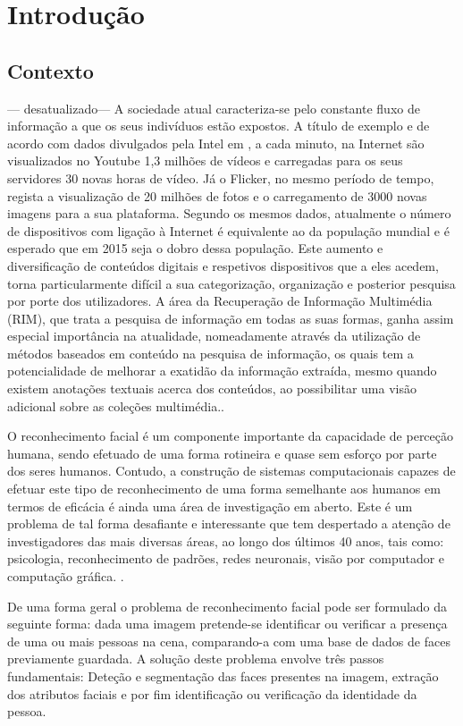 \chapter{Introdução} \label{chap:intro}

\section{Contexto} \label{sec:context}
--- desatualizado---
A sociedade atual caracteriza-se pelo constante fluxo de informação a que os seus indivíduos estão expostos. A título de exemplo e de acordo com dados divulgados pela Intel em \citep{IntelCorporation}, a cada minuto, na Internet são visualizados no Youtube 1,3 milhões de vídeos e carregadas para os seus servidores 30 novas horas de vídeo. Já o Flicker, no mesmo período de tempo, regista a visualização de 20 milhões de fotos e o carregamento de 3000 novas imagens para a sua plataforma.
Segundo os mesmos dados, atualmente o número de dispositivos com ligação à Internet é equivalente ao da população mundial e é esperado que em 2015 seja o dobro dessa população.
Este aumento e diversificação de conteúdos digitais e respetivos dispositivos que a eles acedem, torna particularmente difícil a sua categorização, organização e posterior pesquisa por porte dos utilizadores. A área da  Recuperação de Informação Multimédia (RIM), que trata a pesquisa de informação em todas as suas formas, ganha assim especial importância na atualidade, nomeadamente através da utilização de métodos baseados em conteúdo na pesquisa de informação, os quais tem a potencialidade de melhorar a exatidão da informação extraída, mesmo quando existem anotações textuais acerca dos conteúdos, ao possibilitar uma visão adicional sobre as coleções multimédia.\citep{Lew2006}.

O reconhecimento facial é um componente importante da capacidade de perceção humana, sendo efetuado de uma forma rotineira e quase sem esforço por parte dos seres humanos. Contudo, a construção de sistemas computacionais capazes de efetuar este tipo de reconhecimento de uma forma semelhante aos humanos em termos de eficácia é ainda uma área de investigação em aberto. Este é um problema de tal forma desafiante e interessante que tem despertado a atenção de investigadores das mais diversas áreas, ao longo dos últimos 40 anos, tais como: psicologia, reconhecimento de padrões, redes neuronais, visão por computador e computação gráfica. \citep{Zhao2003}.

De uma forma geral o problema de reconhecimento facial pode ser formulado da seguinte forma: dada uma imagem pretende-se identificar ou verificar a presença de uma ou mais pessoas na cena, comparando-a com uma base de dados de faces previamente guardada. A solução deste problema envolve três passos fundamentais: Deteção e segmentação das faces presentes na imagem, extração dos atributos faciais e por fim identificação ou verificação da identidade da pessoa.\citep{Zhao2003}
	

